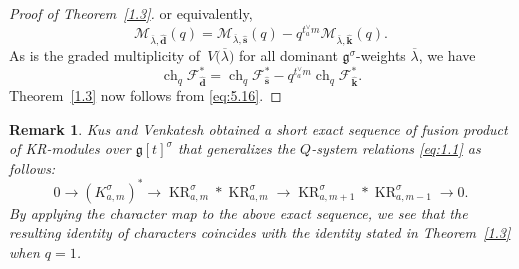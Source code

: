 \documentclass[10pt,a4paper]{amsart}
\numberwithin{equation}{section}
\DeclareMathOperator{\KR}{KR}
\DeclareMathOperator{\ch}{ch}
\newtheorem*{remark*}{Remark}
\begin{document}
\begin{proof}[Proof of Theorem~\ref{1.3}]
or equivalently,
\[
\mathcal{M}_{\overline{\lambda},\widehat{\mathbf{d}}}(q)
=\mathcal{M}_{\overline{\lambda},\widehat{\mathbf{s}}}(q)
-q^{t_a^{\vee}m}\mathcal{M}_{\overline{\lambda},\widehat{\mathbf{k}}}(q).
\]
As  is the graded multiplicity of~$V\bigl(\overline{\lambda}\bigr)$ for all dominant $\mathfrak{g}^{\sigma}$-weights $\overline{\lambda}$, we have
\begin{equation}\label{eq:5.16}
\ch_q\mathcal{F}_{\widehat{\mathbf{d}}}^*
=\ch_q\mathcal{F}_{\widehat{\mathbf{s}}}^*
-q^{t_a^{\vee}m}\ch_q\mathcal{F}_{\widehat{\mathbf{k}}}^*.
\end{equation}
Theorem~\ref{1.3} now follows from \eqref{eq:5.16}.
\end{proof}

\begin{remark*}
Kus and Venkatesh \cite[Proposition 7.3]{KV16} obtained a short exact sequence of fusion product of KR-modules over $\mathfrak{g}[t]^{\sigma}$ that generalizes the  $Q$-system relations \eqref{eq:1.1} as follows:
\begin{equation*}
0\longrightarrow(K_{a,m}^{\sigma})^*\longrightarrow\KR_{a,m}^{\sigma}*\KR_{a,m}^{\sigma}\longrightarrow\KR_{a,m+1}^{\sigma}*\KR_{a,m-1}^{\sigma}\longrightarrow0.
\end{equation*}
By applying the character map to the above exact sequence, we see that the resulting identity of characters coincides with the identity stated in Theorem~\ref{1.3} when $q=1$.
\end{remark*}
\end{document}
